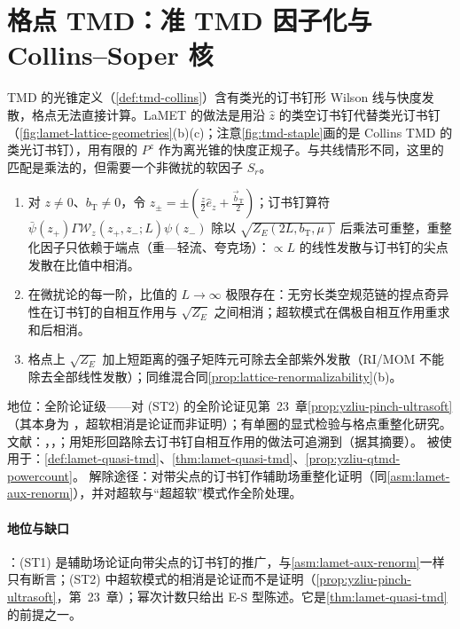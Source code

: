 \section{格点 TMD：准 TMD 因子化与 Collins--Soper 核}\label{sec:lattice-tmd}

TMD 的光锥定义（\cref{def:tmd-collins}）含有类光的订书钉形 Wilson 线与快度发散，格点无法直接计算。LaMET 的做法是用沿 $\hat z$ 的类空订书钉代替类光订书钉（\cref{fig:lamet-lattice-geometries}(b)(c)；注意\cref{fig:tmd-staple}画的是 Collins TMD 的类光订书钉），用有限的 $P^z$ 作为离光锥的快度正规子。与共线情形不同，这里的匹配是乘法的，但需要一个非微扰的软因子 $S_r$。

\begin{assumption}\label{asm:lamet-staple}
\begin{enumerate}[label=(ST\arabic*),leftmargin=3.2em,itemsep=1pt,topsep=2pt]
\item 对 $z\neq0$、$b_{\mathrm T}\neq0$，令 $z_\pm=\pm(\frac z2\hat e_z+\frac{\vec b_{\mathrm T}}2)$；订书钉算符 $\bar\psi(z_+)\Gamma\mathcal W_z(z_+,z_-;L)\psi(z_-)$ 除以 $\sqrt{Z_E(2L,b_{\mathrm T},\mu)}$ 后乘法可重整，重整化因子只依赖于端点（重—轻流、夸克场）：$\propto L$ 的线性发散与订书钉的尖点发散在比值中相消。
\item 在微扰论的每一阶，比值的 $L\to\infty$ 极限存在：无穷长类空规范链的捏点奇异性在订书钉的自相互作用与 $\sqrt{Z_E}$ 之间相消；超软模式在偶极自相互作用重求和后相消。
\item 格点上 $\sqrt{Z_E}$ 加上短距离的强子矩阵元可除去全部紫外发散（RI/MOM 不能除去全部线性发散）；同维混合同\cref{prop:lattice-renormalizability}(b)。
\end{enumerate}
地位：全阶论证级——对 (ST2) 的全阶论证见第~23~章\cref{prop:yzliu-pinch-ultrasoft}（其本身为 \tagA，超软相消是论证而非证明）；有单圈的显式检验与格点重整化研究。
文献：\cite{Ji:2019ewn}，\cite[第~3--4~节]{Liu:2022nnk}，\cite{Ebert:2022fmh,Ebert:2019tvc,Constantinou:2019vyb,Alexandrou:2023ucc}；用矩形回路除去订书钉自相互作用的做法可追溯到\cite{Collins:2008ht,Ji:2018hvs}（据其摘要）。
被使用于：\cref{def:lamet-quasi-tmd}、\cref{thm:lamet-quasi-tmd}、\cref{prop:yzliu-qtmd-powercount}。
解除途径：对带尖点的订书钉作辅助场重整化证明（同\cref{asm:lamet-aux-renorm}），并对超软与“超超软”模式作全阶处理。
\end{assumption}

\paragraph{地位与缺口}
\tagA：(ST1) 是辅助场论证向带尖点的订书钉的推广，与\cref{asm:lamet-aux-renorm}一样只有断言；(ST2) 中超软模式的相消是论证而不是证明（\cref{prop:yzliu-pinch-ultrasoft}，第~23~章）；幂次计数只给出 E-S 型陈述。它是\cref{thm:lamet-quasi-tmd}的前提之一。

